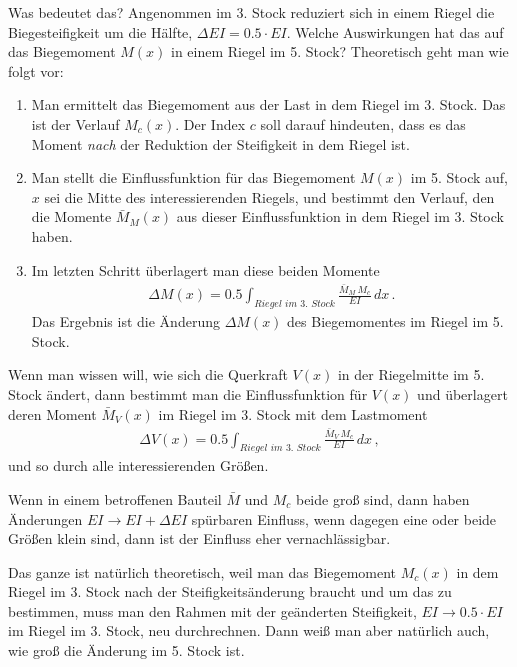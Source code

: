 {{{{Was bedeutet das? Angenommen im 3. Stock reduziert sich in einem Riegel die Biegesteifigkeit um die H\"{a}lfte, $\Delta EI = 0.5 \cdot EI$. Welche Auswirkungen hat das auf das Biegemoment $M(x)$ in einem Riegel im 5. Stock? Theoretisch geht man wie folgt vor:
\begin{enumerate}
  \item Man ermittelt das Biegemoment aus der Last in dem Riegel im 3. Stock. Das ist der Verlauf $M_c(x)$. Der Index $c$ soll darauf hindeuten, dass es das Moment {\em nach\/} der Reduktion der Steifigkeit in dem Riegel ist.
  \item Man stellt die Einflussfunktion f\"{u}r das Biegemoment $M(x)$ im 5. Stock auf, $x$ sei die Mitte des interessierenden Riegels, und bestimmt den Verlauf, den die Momente $\bar{M}_M(x)$ aus dieser Einflussfunktion in dem Riegel im 3. Stock haben.
  \item Im letzten Schritt \"{u}berlagert man diese beiden Momente
\begin{align}
\Delta M(x) = 0.5 \int_{Riegel\,\,im\,\,3.\,\,Stock} \frac{\bar{M}_M\,M_c}{EI}\,dx\,.
\end{align}
   Das Ergebnis ist die \"{A}nderung $\Delta M(x)$ des Biegemomentes im Riegel im 5. Stock.
\end{enumerate}

Wenn man wissen will, wie sich die Querkraft $V(x)$ in der Riegelmitte im 5. Stock \"{a}ndert, dann bestimmt man die Einflussfunktion f\"{u}r $V(x)$ und \"{u}berlagert deren Moment $\bar{M}_V(x)$ im Riegel im 3. Stock mit dem Lastmoment
\begin{align}
\Delta V(x) = 0.5 \int_{Riegel\,\,im\,\,3.\,\,Stock} \frac{\bar{M}_V\,M_c}{EI}\,dx\,,
\end{align}
und so durch alle interessierenden Gr\"{o}{\ss}en.

Wenn in einem betroffenen Bauteil $\bar{M}$ und $M_c$ beide gro{\ss} sind, dann haben \"{A}nderungen $EI \to EI + \Delta EI$ sp\"{u}rbaren Einfluss, wenn dagegen eine oder beide Gr\"{o}{\ss}en klein sind, dann ist der Einfluss eher vernachl\"{a}ssigbar.

Das ganze ist nat\"{u}rlich theoretisch, weil man das Biegemoment $M_c(x)$ in dem Riegel im 3. Stock nach der Steifigkeits\"{a}nderung braucht und um das zu bestimmen, muss man den Rahmen mit der ge\"{a}nderten Steifigkeit, $EI \to 0.5 \cdot EI$ im Riegel im 3. Stock, neu durchrechnen. Dann wei{\ss} man aber nat\"{u}rlich auch, wie gro{\ss} die \"{A}nderung im 5. Stock ist.

}}}}
